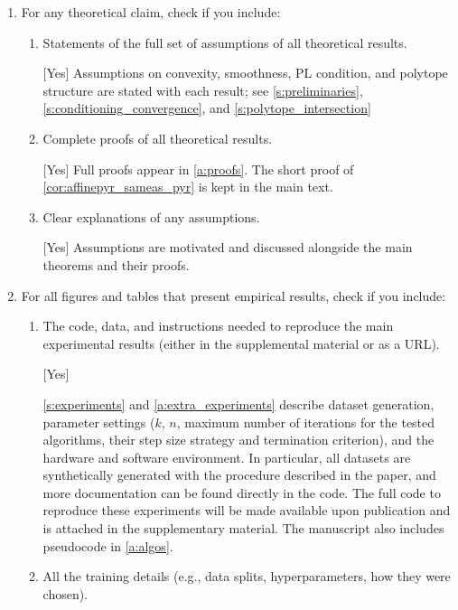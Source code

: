 \documentclass[twoside]{article}
\begin{document}
\begin{enumerate}
\begin{enumerate}
\end{enumerate}

\item For any theoretical claim, check if you include:
\begin{enumerate}
\item Statements of the full set of assumptions of all theoretical results.

[Yes]
Assumptions on convexity, smoothness, PL condition, and polytope structure are stated with each result; see \cref{s:preliminaries}, \cref{s:conditioning_convergence}, and \cref{s:polytope_intersection}
\item Complete proofs of all theoretical results.

[Yes]
Full proofs appear in \cref{a:proofs}. The short proof of \cref{cor:affinepyr_sameas_pyr} is kept in the main text.
\item Clear explanations of any assumptions.

[Yes] Assumptions are motivated and discussed alongside the main theorems and their proofs.
\end{enumerate}

\item For all figures and tables that present empirical results, check if you include:
\begin{enumerate}
\item The code, data, and instructions needed to reproduce the main experimental results (either in the supplemental material or as a URL).

[Yes]

\cref{s:experiments} and \cref{a:extra_experiments} describe dataset generation, parameter settings ($k$, $n$, maximum number of iterations for the tested algorithms, their step size strategy and termination criterion), and the hardware and software environment. 
In particular, all datasets are synthetically generated with the procedure described in the paper, and more documentation can be found directly in the code. The full code to reproduce these experiments will be made available upon publication and is attached in the supplementary material.
The manuscript also includes pseudocode in \cref{a:algos}. 
\item All the training details (e.g., data splits, hyperparameters, how they were chosen).


\end{enumerate}
\end{enumerate}
\end{document}
